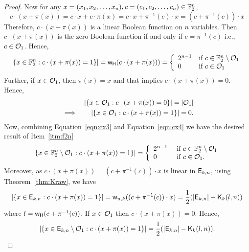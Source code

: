 \documentclass{llncs}
\begin{document}
\begin{proof}
Now for any $x = (x_1, x_2, \ldots, x_n), c = (c_1, c_2, \ldots, c_n) \in \mathbb{F}_2^n$,
\begin{equation}\label{eqn:cx2}
c \cdot (x+\pi(x)) = c \cdot x + c \cdot \pi(x) = c \cdot x + \pi^{-1}(c) \cdot x  =  (c+\pi^{-1}(c)) \cdot x 
\end{equation}
Therefore, $c \cdot (x+\pi(x))$ is a linear Boolean function on $n$ variables. 
Then $c \cdot (x+\pi(x))$ is the zero Boolean function if and only if $c  = \pi^{-1}(c)$ i.e., $c \in \mathcal{O}_1$.
Hence,
\begin{equation}\label{eqn:cx3}
|\{x \in \mathbb{F}_2^n : c \cdot (x + \pi(x))= 1\}| = \mathsf{w_H}(c \cdot (x+\pi(x))) 
= \left\{ \begin{array}{ll}
2^{n-1} & \text{if } c \in \mathbb{F}_2^n \setminus \mathcal{O}_1 \\
0 & \text{if } c \in \mathcal{O}_1
\end{array} \right.
\end{equation}
Further, if $x \in \mathcal{O}_1$, then $\pi(x) = x$ and that implies $c \cdot (x+\pi(x)) = 0$. Hence,
\begin{eqnarray}\label{eqn:cx4}
&& |\{x \in \mathcal{O}_1 : c \cdot (x + \pi(x))= 0\}| = |\mathcal{O}_1|\nonumber \\
&\implies & |\{x \in \mathcal{O}_1 : c \cdot (x + \pi(x))= 1\}| = 0.
\end{eqnarray}
Now, combining Equation~\ref{eqn:cx3} and Equation~\ref{eqn:cx4} we have the desired result of Item~\ref{itm:f2n}
$$|\{x \in \mathbb{F}_2^n \setminus \mathcal{O}_1 : c \cdot (x + \pi(x))= 1\}| 
= \left \{ \begin{array}{ll}
2^{n-1}  &  \text{ if } c \in \mathbb{F}_2^n \setminus \mathcal{O}_1  \\
0              &  \text{ if } c \in \mathcal{O}_1.
\end{array} \right.$$
Moreover, as $c \cdot (x+\pi(x)) = (c+\pi^{-1}(c)) \cdot x$ is linear in $\mathsf{E}_{k,n}$, using Theorem~\ref{thm:Kraw}, we have
$$\left| \{x \in \mathsf{E}_{k,n} : c \cdot (x + \pi(x))= 1\} \right| = \mathsf{w}_{n,k}((c+\pi^{-1}(c)) \cdot x) = \frac{1}{2} (|\mathsf{E}_{k,n}| - \mathsf{K}_{k}(l,n))$$
where $l = \mathsf{w_H}(c+\pi^{-1}(c))$. 
If $x \in \mathcal{O}_1$ then $c \cdot (x+\pi(x)) = 0$. Hence,
$$\left| \{x \in \mathsf{E}_{k,n} \setminus \mathcal{O}_1 : c \cdot (x + \pi(x))= 1\} \right| 
= \frac{1}{2} (|\mathsf{E}_{k,n}| - \mathsf{K}_{k}(l,n)).$$
\end{proof} 
\end{document}
